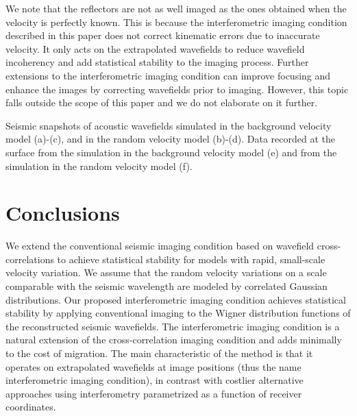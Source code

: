 We note that the reflectors are not as well imaged as the ones
obtained when the velocity is perfectly known. This is because the
interferometric imaging condition described in this paper does not
correct kinematic errors due to inaccurate velocity. It only acts on
the extrapolated wavefields to reduce wavefield incoherency and add
statistical stability to the imaging process. Further extensions to
the interferometric imaging condition can improve focusing and enhance
the images by correcting wavefields prior to imaging. However, this
topic falls outside the scope of this paper and we do not elaborate on
it further.



{Seismic snapshots of acoustic wavefields simulated in the
background velocity model (a)-(c), and in the random velocity model
(b)-(d).  Data recorded at the surface from the simulation in the
background velocity model (e) and from the simulation in the random
velocity model (f).}


\section{Conclusions}
We extend the conventional seismic imaging condition based on
wavefield cross-correlations to achieve statistical stability for
models with rapid, small-scale velocity variation. We assume that the
random velocity variations on a scale comparable with the seismic
wavelength are modeled by correlated Gaussian distributions.  Our
proposed interferometric imaging condition achieves statistical
stability by applying conventional imaging to the Wigner distribution
functions of the reconstructed seismic wavefields. The interferometric
imaging condition is a natural extension of the cross-correlation
imaging condition and adds minimally to the cost of migration. The
main characteristic of the method is that it operates on extrapolated
wavefields at image positions (thus the name interferometric imaging
condition), in contrast with costlier alternative approaches using
interferometry parametrized as a function of receiver coordinates.

